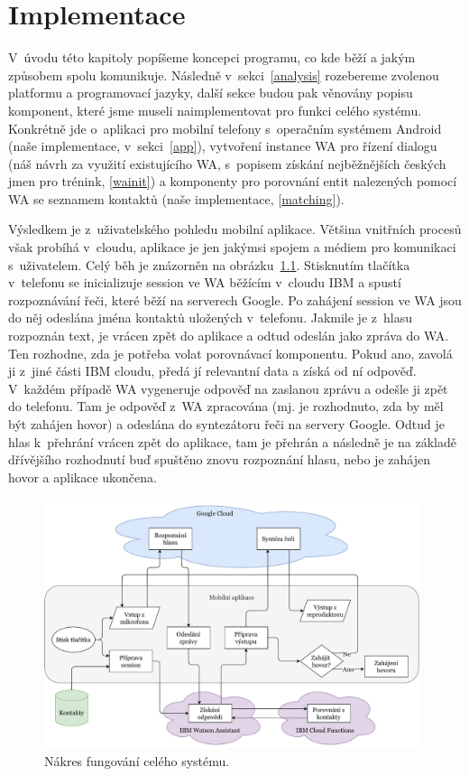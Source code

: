 \chapter{Implementace}\label{chapter-implementation}

V~úvodu této kapitoly popíšeme koncepci programu, co kde
běží a jakým způsobem spolu komunikuje. Následně v~sekci~\ref{analysis}
rozebereme zvolenou platformu a programovací jazyky,
další sekce budou pak věnovány popisu komponent, které jsme museli
naimplementovat pro funkci celého systému. Konkrétně jde o~aplikaci pro
mobilní telefony s~operačním systémem Android (naše implementace,
v~sekci~\ref{app}), vytvoření instance WA pro řízení
dialogu (náš návrh za využití existujícího WA,
s~popisem získání nejběžnějších českých jmen pro trénink, \ref{wainit}) a komponenty
pro porovnání entit nalezených pomocí WA se seznamem kontaktů (naše implementace,
\ref{matching}).

Výsledkem je z~uživatelského pohledu mobilní
aplikace. Většina vnitřních procesů však probíhá v~cloudu, aplikace
je jen jakýmsi spojem a médiem pro komunikaci s~uživatelem. Celý běh
je znázorněn na obrázku~\ref{img-flowchart}. Stisknutím tlačítka
v~telefonu se
inicializuje session ve WA běžícím v~cloudu IBM a spustí rozpoznávání řeči,
které běží na serverech Google. Po zahájení session ve WA jsou do něj
odeslána jména kontaktů uložených v~telefonu. Jakmile je z~hlasu rozpoznán
text, je vrácen zpět do aplikace a odtud odeslán jako zpráva do WA.
Ten rozhodne, zda je potřeba volat
porovnávací komponentu. Pokud ano, zavolá ji z~jiné části IBM cloudu,
předá jí relevantní data a získá od ní odpověď. V~každém případě
WA vygeneruje odpověď na zaslanou zprávu a odešle ji zpět do telefonu.
Tam je odpověď z~WA zpracována (mj. je rozhodnuto, zda by měl být
zahájen hovor) a odeslána do syntezátoru řeči na servery Google.
Odtud je hlas k~přehrání vrácen zpět do aplikace, tam je přehrán
a následně je na základě dřívějšího rozhodnutí buď spuštěno znovu
rozpoznání hlasu, nebo je zahájen hovor a aplikace ukončena.


\begin{figure}[h]
    \centering
    \includegraphics[width=0.98\textwidth]{../img/app-flowchart.pdf}
    \caption{Nákres fungování celého systému.}
    \label{img-flowchart}
\end{figure}

